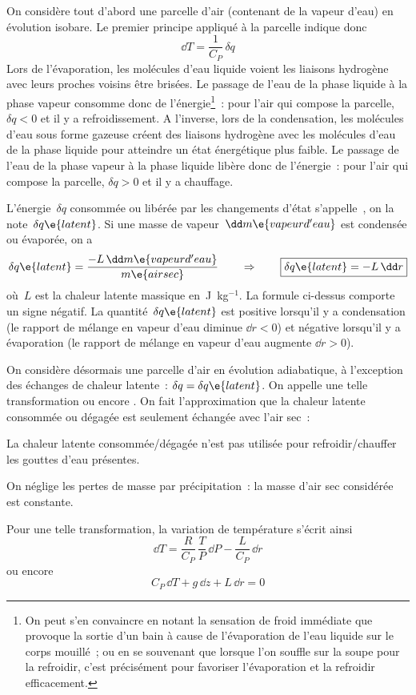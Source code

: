 \sk
On considère tout d'abord une parcelle d'air (contenant de la vapeur d'eau) en évolution isobare. Le premier principe appliqué à la parcelle indique donc
\[ \dd T = \frac{1}{C_P} \, \delta q \]
Lors de l'évaporation, les molécules d'eau liquide voient les liaisons hydrogène avec leurs proches voisins être brisées. Le passage de l'eau de la phase liquide à la phase vapeur consomme donc de l'énergie\footnote{On peut s'en convaincre en notant la sensation de froid immédiate que provoque la sortie d'un bain à cause de l'évaporation de l'eau liquide sur le corps mouillé~; ou en se souvenant que lorsque l'on souffle sur la soupe pour la refroidir, c'est précisément pour favoriser l'évaporation et la refroidir efficacement.}~: pour l'air qui compose la parcelle, $\delta q < 0$ et il y a refroidissement. 
A l'inverse, lors de la condensation, les molécules d'eau sous forme gazeuse créent des liaisons hydrogène avec les molécules d'eau de la phase liquide pour atteindre un état énergétique plus faible. Le passage de l'eau de la phase vapeur à la phase liquide libère donc de l'énergie~: pour l'air qui compose la parcelle, $\delta q > 0$ et il y a chauffage.

\sk
L'énergie~$\delta q$ consommée ou libérée par les changements d'état s'appelle~, on la note~$\delta q\e{latent}$. Si une masse de vapeur~$\dd m\e{vapeur d'eau}$ est condensée ou évaporée, on a
\[ \delta q\e{latent} = \frac{- L \, \dd m\e{vapeur d'eau}}{m\e{air sec}} \qquad \Rightarrow \qquad \boxed{ \delta q\e{latent} = - L \, \dd r } \]
où~$L$ est la chaleur latente massique en~J~kg$^{-1}$. La formule ci-dessus comporte un signe négatif. La quantité~$\delta q\e{latent}$ est positive lorsqu'il y a condensation (le rapport de mélange en vapeur d'eau diminue $\dd r < 0$) et négative lorsqu'il y a évaporation (le rapport de mélange en vapeur d'eau augmente $\dd r > 0$).

\sk
On considère désormais une parcelle d'air en évolution adiabatique, à l'exception des échanges de chaleur latente~: $\delta q = \delta q\e{latent}$. On appelle une telle transformation  ou encore . On fait l'approximation que la chaleur latente consommée ou dégagée est seulement échangée avec l'air sec~:
\begin{citemize}
\item La chaleur latente consommée/dégagée n'est pas utilisée pour refroidir/chauffer les gouttes d'eau présentes.
\item On néglige les pertes de masse par précipitation~: la masse d'air sec considérée est constante.
\end{citemize}
Pour une telle transformation, la variation de température s'écrit ainsi
\[ \dd T = \frac{R}{C_P} \, \frac{T}{P} \, \dd P - \frac{L}{C_P} \, \dd r \]
\noindent ou encore
\[ C_P \, \dd T + g \, \dd z + L \, \dd r = 0 \]
